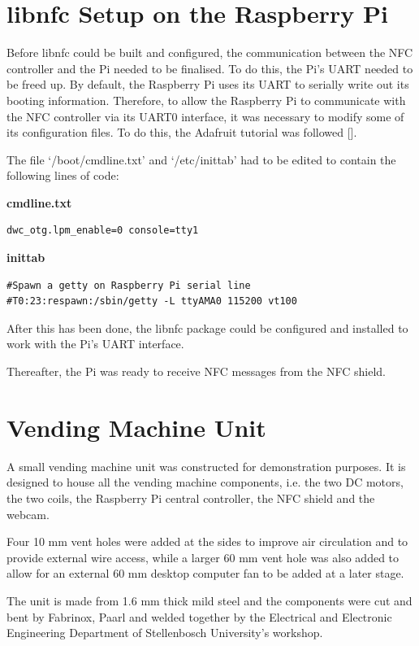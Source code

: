 \section{libnfc Setup on the Raspberry Pi}

Before libnfc could be built and configured, the communication between the NFC
controller and the Pi needed to be finalised. To do this, the Pi's UART needed
to be freed up. By default, the Raspberry Pi uses its UART to serially write out
its booting information. Therefore, to allow the Raspberry Pi to communicate
with the NFC controller via its UART0 interface, it was necessary to modify
some of its configuration files. To do this, the Adafruit tutorial was followed
[\cite{website:adafruit-tutorial}].

The file `/boot/cmdline.txt' and `/etc/inittab' had to be edited to
contain the following lines of code:

\textbf{cmdline.txt}
\begin{verbatim}
dwc_otg.lpm_enable=0 console=tty1
\end{verbatim}

\textbf{inittab}
\begin{verbatim}
#Spawn a getty on Raspberry Pi serial line
#T0:23:respawn:/sbin/getty -L ttyAMA0 115200 vt100
\end{verbatim}

After this has been done, the libnfc package could be configured and installed 
to work with the Pi's UART interface.

Thereafter, the Pi was ready to receive NFC messages from the NFC shield.

\section{Vending Machine Unit}

A small vending machine unit was constructed for demonstration purposes. It is
designed to house all the vending machine components, i.e. the two DC motors,
the two coils, the Raspberry Pi central controller, the NFC shield and the
webcam.

Four 10 mm vent holes were added at the sides to improve air circulation
and to provide external wire access, while a larger 60 mm vent hole was also
added to allow for an external 60 mm desktop computer fan to be added at a
later stage.

The unit is made from 1.6 mm thick mild steel and the components were cut and
bent by Fabrinox, Paarl and welded together by the Electrical and Electronic
Engineering Department of Stellenbosch University's workshop.

